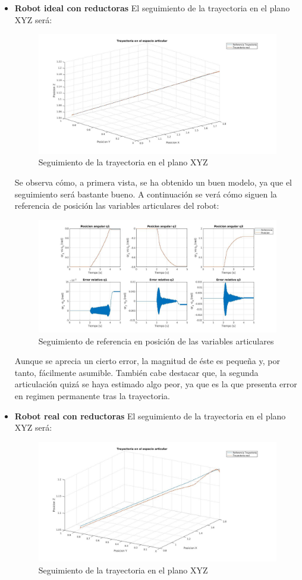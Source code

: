 \begin{itemize}
	\item \textbf{Robot ideal con reductoras}
	El seguimiento de la trayectoria en el plano XYZ será:
	\begin{figure}[h!]
		\centering
		\includegraphics[width=.7\textwidth]{exp3_trayPDideal}
		\caption{Seguimiento de la trayectoria en el plano XYZ}
	\end{figure}

	Se observa cómo, a primera vista, se ha obtenido un buen modelo, ya que el seguimiento será bastante bueno. A continuación se verá cómo siguen la referencia de posición las variables articulares del robot:

	\begin{figure}[h!]
		\centering
		\includegraphics[width=.8\textwidth]{exp3_posPDidealCR}
		\caption{Seguimiento de referencia en posición de las variables articulares}
	\end{figure}

\newpage
	Aunque se aprecia un cierto error, la magnitud de éste es pequeña y, por tanto, fácilmente asumible. También cabe destacar que, la segunda articulación quizá se haya estimado algo peor, ya que es la que presenta error en regimen permanente tras la trayectoria. \\

	\item \textbf{Robot real con reductoras}
	El seguimiento de la trayectoria en el plano XYZ será:

	\begin{figure}[h!]
		\centering
		\includegraphics[width=.8\textwidth]{exp3_trayPDreal}
		\caption{Seguimiento de la trayectoria en el plano XYZ}
	\end{figure}


\end{itemize}
